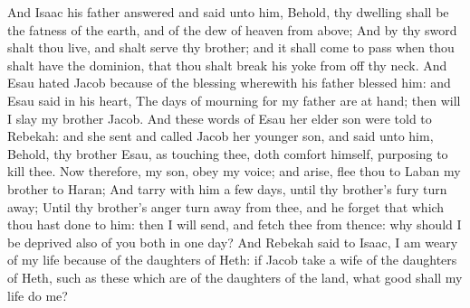 \begin{biblechapter}
\verse And Isaac his father answered and said unto him, Behold, thy dwelling shall be the fatness of the earth, and of the dew of heaven from above;
\verse And by thy sword shalt thou live, and shalt serve thy brother; and it shall come to pass when thou shalt have the dominion, that thou shalt break his yoke from off thy neck.
\verse And Esau hated Jacob because of the blessing wherewith his father blessed him: and Esau said in his heart, The days of mourning for my father are at hand; then will I slay my brother Jacob.
\verse And these words of Esau her elder son were told to Rebekah: and she sent and called Jacob her younger son, and said unto him, Behold, thy brother Esau, as touching thee, doth comfort himself, purposing to kill thee.
\verse Now therefore, my son, obey my voice; and arise, flee thou to Laban my brother to Haran;
\verse And tarry with him a few days, until thy brother's fury turn away;
\verse Until thy brother's anger turn away from thee, and he forget that which thou hast done to him: then I will send, and fetch thee from thence: why should I be deprived also of you both in one day?
\verse And Rebekah said to Isaac, I am weary of my life because of the daughters of Heth: if Jacob take a wife of the daughters of Heth, such as these which are of the daughters of the land, what good shall my life do me?
\end{biblechapter}

